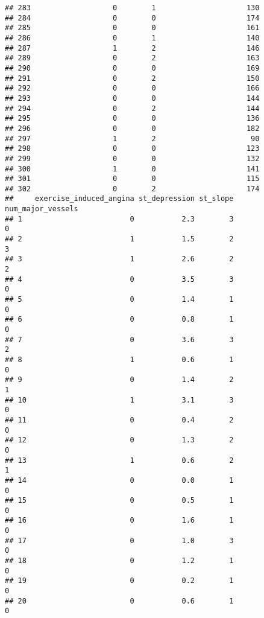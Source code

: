 \documentclass[]{article}
\begin{document}
\begin{verbatim}
## 283                   0        1                     130
## 284                   0        0                     174
## 285                   0        0                     161
## 286                   0        1                     140
## 287                   1        2                     146
## 289                   0        2                     163
## 290                   0        0                     169
## 291                   0        2                     150
## 292                   0        0                     166
## 293                   0        0                     144
## 294                   0        2                     144
## 295                   0        0                     136
## 296                   0        0                     182
## 297                   1        2                      90
## 298                   0        0                     123
## 299                   0        0                     132
## 300                   1        0                     141
## 301                   0        0                     115
## 302                   0        2                     174
##     exercise_induced_angina st_depression st_slope num_major_vessels
## 1                         0           2.3        3                 0
## 2                         1           1.5        2                 3
## 3                         1           2.6        2                 2
## 4                         0           3.5        3                 0
## 5                         0           1.4        1                 0
## 6                         0           0.8        1                 0
## 7                         0           3.6        3                 2
## 8                         1           0.6        1                 0
## 9                         0           1.4        2                 1
## 10                        1           3.1        3                 0
## 11                        0           0.4        2                 0
## 12                        0           1.3        2                 0
## 13                        1           0.6        2                 1
## 14                        0           0.0        1                 0
## 15                        0           0.5        1                 0
## 16                        0           1.6        1                 0
## 17                        0           1.0        3                 0
## 18                        0           1.2        1                 0
## 19                        0           0.2        1                 0
## 20                        0           0.6        1                 0

\end{verbatim}
\end{document}
